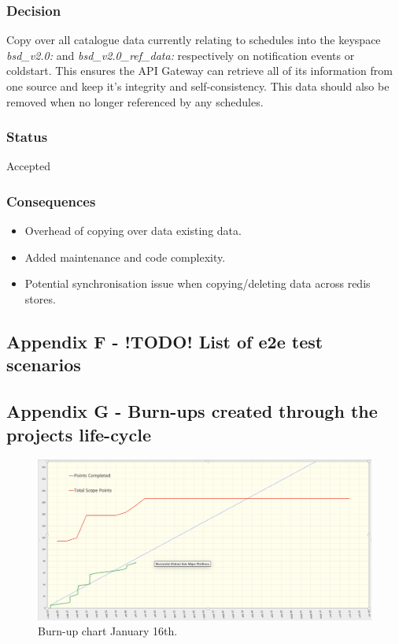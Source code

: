   \subsubsection*{Decision}
  Copy over all catalogue data currently relating to schedules into the keyspace \emph{{bsd\_v2.0}:} and \emph{{bsd\_v2.0\_ref\_data}:} respectively on 
  notification events or coldstart. This ensures the API Gateway can retrieve all of its information from one source and keep it's integrity and
  self-consistency. This data should also be removed when no longer referenced by any schedules.

  \subsubsection*{Status}
  Accepted

  \subsubsection*{Consequences}
    \begin{itemize}
      \item Overhead of copying over data existing data.
      \item Added maintenance and code complexity.
      \item Potential synchronisation issue when copying/deleting data across redis stores.
    \end{itemize}


  \newpage
  \subsection{Appendix F - !TODO! List of e2e test scenarios}
    \label{sec:AppendixF}
    

  \newpage
  \subsection{Appendix G - Burn-ups created through the projects life-cycle}
    \label{sec:AppendixG}

    \begin{figure}[H]
      \centering
      \includegraphics[width=12cm]{assets/outputs/burnups/01-16.png}
      \caption{Burn-up chart January 16th.}
      \label{fig:burnup1}
    \end{figure}
  
